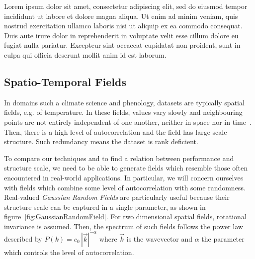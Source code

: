 \documentclass[ijgi,article,submit,moreauthors,pdftex,10pt,a4paper]{Definitions/mdpi}
\begin{document}


Lorem ipsum dolor sit amet, consectetur adipiscing elit, sed do eiusmod tempor incididunt ut labore et dolore magna aliqua. Ut enim ad minim veniam, quis nostrud exercitation ullamco laboris nisi ut aliquip ex ea commodo consequat. Duis aute irure dolor in reprehenderit in voluptate velit esse cillum dolore eu fugiat nulla pariatur. Excepteur sint occaecat cupidatat non proident, sunt in culpa qui officia deserunt mollit anim id est laborum.

\subsection{Spatio-Temporal Fields}
\label{sec:Materials and Methods/Spatio-Temporal Fields}

In domains such a climate science and phenology, datasets are typically spatial fields, e.g. of temperature. In these fields, values vary slowly and neighbouring points are not entirely independent of one another, neither in space nor in time~\cite{Eshel2011}. Then, there is a high level of autocorrelation and the field has large scale structure. Such redundancy means the dataset is rank deficient.

To compare our techniques and to find a relation between performance and structure scale, we need to be able to generate fields which resemble those often encountered in real-world applications. In particular, we will concern ourselves with fields which combine some level of autocorrelation with some randomness. Real-valued \textit{Gaussian Random Fields} are particularly useful because their structure scale can be captured in a single parameter, as shown in figure~\ref{fig:GaussianRandomField}. For two dimensional spatial fields, rotational invariance is assumed. Then, the spectrum of such fields follows the power law described by $P(k) = c_{0} \, |\vec{k}|^{-\alpha}$ where $\vec{k}$ is the wavevector and $\alpha$ the parameter which controls the level of autocorrelation.
\end{document}
